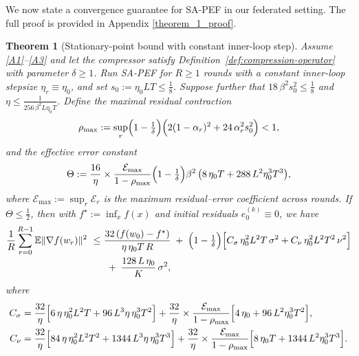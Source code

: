 \documentclass{article} %
\newcommand{\E}{\mathbb{E}}
\newtheorem{theorem}{Theorem}[section]
\newtheorem{remark}{Remark}
\begin{document}
We now state a convergence guarantee for SA-PEF in our federated setting. 
The full proof is provided in Appendix \ref{theorem_1_proof}.
\begin{theorem}[Stationary-point bound with constant inner-loop step]
\label{main_theorem}
Assume \ref{A1}--\ref{A3} and let the compressor satisfy Definition~\ref{def:compression-operator} with parameter $\delta\ge1$.
Run SA-PEF for $R\ge1$ rounds with a constant inner-loop stepsize $\eta_r\equiv\eta_0$, and set $s_0:=\eta_0LT\le \tfrac18$. Suppose further that
\(18\,\beta^{2}s_0^{2}\le \tfrac18\) and \(\eta\le \frac{1}{256\,\beta^{2}L\eta_0T}\).
Define the maximal residual contraction
\[
\rho_{\max}:=\sup_r\Bigl(1-\tfrac1\delta\Bigr)\Bigl(2(1-\alpha_r)^2+24\,\alpha_r^2 s_0^2\Bigr)<1,
\]
and the effective error constant
\[
\Theta:=\frac{16}{\eta}\times\frac{\mathcal E_{\max}}{1-\rho_{\max}}\Bigl(1-\tfrac1\delta\Bigr)\beta^{2}\,
\bigl(8\,\eta_0T+288\,L^{2}\eta_0^{3}T^{3}\bigr),
\]
where $\mathcal E_{\max}:=\sup_{r}\mathcal E_r$ is the maximum residual–error coefficient across rounds.
If $\Theta\le\tfrac12$, then with $f^\star:=\inf_x f(x)$ and initial residuals $e_0^{(k)}\equiv0$, we have
\begin{align*}
\frac{1}{R}\sum_{r=0}^{R-1}\E\|\nabla f(w_r)\|^{2}
\ \le\
&\frac{32\,(f(w_0)-f^\star)}{\eta\,\eta_0T\,R}
\;+\;\Bigl(1-\tfrac{1}{\delta}\Bigr)\Bigl[
C_\sigma\,\eta_0^{2}L^{2}T\,\sigma^{2}
+ C_\nu\,\eta_0^{2}L^{2}T^{2}\,\nu^{2}\Bigr]
\\[-2pt]
&\;+\;\frac{128\,L\,\eta_0}{K}\,\sigma^{2},
\end{align*}
where
\[
\begin{aligned}
C_\sigma&=\frac{32}{\eta}\Bigl[6\,\eta\,\eta_0^{2}L^{2}T+96\,L^{3}\eta\,\eta_0^{3}T^{2}\Bigr]
+\frac{32}{\eta}\times\frac{\mathcal E_{\max}}{1-\rho_{\max}}\Bigl[4\,\eta_0+96\,L^{2}\eta_0^{3}T^{2}\Bigr],\\
C_\nu&=\frac{32}{\eta}\Bigl[84\,\eta\,\eta_0^{2}L^{2}T^{2}+1344\,L^{3}\eta\,\eta_0^{3}T^{3}\Bigr]
+\frac{32}{\eta}\times\frac{\mathcal E_{\max}}{1-\rho_{\max}}\Bigl[8\,\eta_0T+1344\,L^{2}\eta_0^{3}T^{3}\Bigr].
\end{aligned}
\]
\end{theorem}

\end{document}
